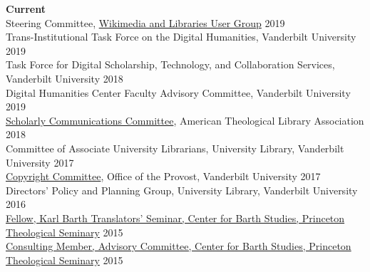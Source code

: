 \documentclass[10pt]{res} %
\begin{document}
\begin{resume}
{\bf Current} \\
Steering Committee, \href{https://meta.wikimedia.org/wiki/Wikimedia_and_Libraries_User_Group}{Wikimedia and Libraries User Group} \hfill 2019\\ 
Trans-Institutional Task Force on the Digital Humanities, Vanderbilt University \hfill 2019\\
Task Force for Digital Scholarship, Technology, and Collaboration Services, Vanderbilt University \hfill 2018\\
Digital Humanities Center Faculty Advisory Committee, Vanderbilt University \hfill 2019\\
\href{https://www.atla.com/about/committees-councils-task-forces/scholarly-communication-committee/}{Scholarly Communications Committee}, American Theological Library Association \hfill 2018\\
Committee of Associate University Librarians, University Library, Vanderbilt University \hfill 2017\\
\href{https://vanderbilt.edu/provost/people/cyrus/committees/copyright-committee.php}{Copyright Committee}, Office of the Provost, Vanderbilt University \hfill 2017\\
Directors' Policy and Planning Group, University Library, Vanderbilt University \hfill 2016\\
\href{http://barth.ptsem.edu/event/translators-seminar}{Fellow, Karl Barth Translators’ Seminar, Center for Barth Studies, Princeton Theological Seminary} \hfill 2015\\
\href{http://barth.ptsem.edu/about-cbs/the-advisory-committee}{Consulting Member, Advisory Committee, Center for Barth Studies, Princeton Theological Seminary}  \hfill 2015 \\


\end{resume}
\end{document}
